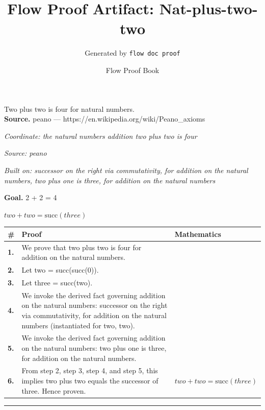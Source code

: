 \documentclass[11pt]{article}
\title{Flow Proof Artifact: Nat-plus-two-two}
\author{Generated by \texttt{flow doc proof}}
\date{Flow Proof Book}
\theoremstyle{definition}
\begin{document}
\maketitle
Two plus two is four for natural numbers.\\[0.5em]
\textbf{Source.} peano — https://en.wikipedia.org/wiki/Peano\_axioms\\[0.5em]
\bigskip
{}\par
\smallskip\noindent\textit{Coordinate: the natural numbers \cdot addition \cdot two plus two is four}\par
\smallskip\noindent\textit{Source: peano}\par
\smallskip\noindent\textit{Built on: successor on the right via commutativity, for addition on the natural numbers, two plus one is three, for addition on the natural numbers}\par
\medskip
\noindent\textbf{Goal.} 2 + 2 = 4\par
\noindent$\displaystyle two + two = \mathrm{succ}(three)$\par
\medskip
\noindent
\begin{tabular}{@{} >{\raggedright\arraybackslash}p{} >{\raggedright\arraybackslash}p{} >{\raggedleft\arraybackslash}p{} @{}}
\textbf{\#} & \textbf{Proof} & \textbf{Mathematics} \\
\midrule
\textbf{1.} & We prove that two plus two is four for addition on the natural numbers. & \\[0.45em]
\textbf{2.} & Let two = succ(succ(0)). & \\[0.45em]
\textbf{3.} & Let three = succ(two). & \\[0.45em]
\textbf{4.} & We invoke the derived fact governing addition on the natural numbers: successor on the right via commutativity, for addition on the natural numbers (instantiated for two, two). & \\[0.45em]
\textbf{5.} & We invoke the derived fact governing addition on the natural numbers: two plus one is three, for addition on the natural numbers. & \\[0.45em]
\textbf{6.} & From step 2, step 3, step 4, and step 5, this implies two plus two equals the successor of three. Hence proven. & $\displaystyle two + two = \mathrm{succ}(three)$ \\[0.45em]
\bottomrule
\end{tabular}
\label{thm:Nat-addition-two_plus_two_is_four}
\par\medskip\hrule
\end{document}
